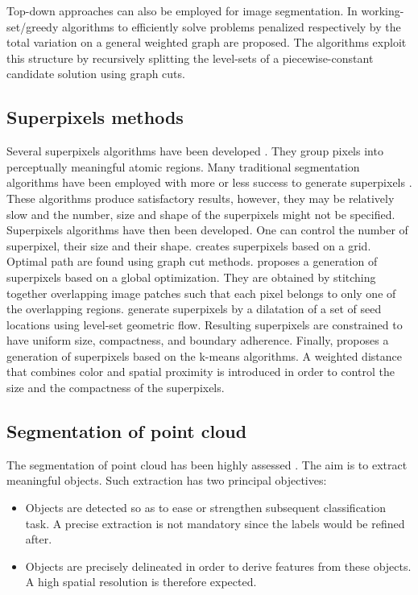 Top-down approaches can also be employed for image segmentation. In \cite{landrieu2016cut} working-set/greedy algorithms to efficiently solve problems penalized respectively by the total variation on a general weighted graph are proposed. The algorithms exploit this structure by recursively splitting the level-sets of a piecewise-constant candidate solution using graph cuts.

\subsection{Superpixels methods}
Several superpixels algorithms have been developed \citep{achanta2012slic}. They group pixels into perceptually meaningful atomic regions. Many traditional segmentation algorithms have been employed with more or less success to generate superpixels \citep{shi2000normalized, felzenszwalb2004efficient, comaniciu2002mean, vedaldi2008quick, vincent1991watersheds}. These algorithms produce satisfactory results, however, they may be relatively slow and the number, size and shape of the superpixels might not be specified. \\

Superpixels algorithms have then been developed. One can control the number of superpixel, their size and their shape. \cite{moore2008superpixel} creates superpixels based on a grid. Optimal path are found using graph cut methods. \cite{veksler2010superpixels} proposes a generation of superpixels based on a global optimization. They are obtained by stitching together overlapping image patches such that each pixel belongs to only one of the overlapping regions. \cite{levinshtein2009turbopixels} generate superpixels by a dilatation of a set of seed locations using level-set geometric flow. Resulting superpixels are constrained to have uniform size, compactness, and boundary adherence. Finally, \cite{achanta2012slic} proposes a generation of superpixels based on the k-means algorithms. A weighted distance that combines color and spatial proximity is introduced in order to control the size and the compactness of the superpixels.


\subsection{Segmentation of point cloud}
The segmentation of point cloud has been highly assessed \citep{nguyen20133d}. The aim is to extract meaningful objects. Such extraction has two principal objectives:
\begin{itemize}
\item Objects are detected so as to ease or strengthen subsequent classification task. A precise extraction is not mandatory since the labels would be refined after.
\item Objects are precisely delineated in order to derive features from these objects. A high spatial resolution is therefore expected.
\end{itemize}

